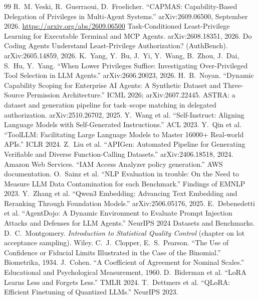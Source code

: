 \documentclass[11pt]{article}
\begin{document}
\begin{thebibliography}{99}
 R.~M. Veski, R.~Guerraoui, D.~Froelicher. ``CAPMAS: Capability-Based Delegation of
  Privileges in Multi-Agent Systems.'' arXiv:2609.06500, September 2026.
  \url{https://arxiv.org/abs/2609.06500}
 Task-Conditioned Least-Privilege Learning for Executable Terminal and MCP Agents. arXiv:2608.18351, 2026.
 Do Coding Agents Understand Least-Privilege Authorization? (AuthBench). arXiv:2605.14859, 2026.
 K.~Yang, Y.~Bu, J.~Yi, Y.~Wang, B.~Zhou, J.~Dai, S.~Hu, Y.~Yang. ``When Lower Privileges Suffice:
  Investigating Over-Privileged Tool Selection in LLM Agents.'' arXiv:2606.20023, 2026.
 H.~B.~Noyan. ``Dynamic Capability Scoping for Enterprise AI Agents: A Synthetic Dataset and
  Three-Source Permission Architecture.'' ICML 2026; arXiv:2607.22445.
 ASTRA: a dataset and generation pipeline for task--scope matching in delegated authorization. arXiv:2510.26702, 2025.
 Y.~Wang et al. ``Self-Instruct: Aligning Language Models with Self-Generated Instructions.'' ACL 2023.
 Y.~Qin et al. ``ToolLLM: Facilitating Large Language Models to Master 16000+ Real-world APIs.'' ICLR 2024.
 Z.~Liu et al. ``APIGen: Automated Pipeline for Generating Verifiable and Diverse Function-Calling Datasets.'' arXiv:2406.18518, 2024.
 Amazon Web Services. ``IAM Access Analyzer policy generation.'' AWS documentation.
 O.~Sainz et al. ``NLP Evaluation in trouble: On the Need to Measure LLM Data Contamination for each Benchmark.'' Findings of EMNLP 2023.
 Y.~Zhang et al. ``Qwen3 Embedding: Advancing Text Embedding and Reranking Through Foundation Models.'' arXiv:2506.05176, 2025.
 E.~Debenedetti et al. ``AgentDojo: A Dynamic Environment to Evaluate Prompt Injection Attacks and Defenses for LLM Agents.'' NeurIPS 2024 Datasets and Benchmarks.
 D.~C.~Montgomery. \emph{Introduction to Statistical Quality Control} (chapter on lot acceptance sampling). Wiley.
 C.~J.~Clopper, E.~S.~Pearson. ``The Use of Confidence or Fiducial Limits Illustrated in the Case of the Binomial.'' Biometrika, 1934.
 J.~Cohen. ``A Coefficient of Agreement for Nominal Scales.'' Educational and Psychological Measurement, 1960.
 D.~Biderman et al. ``LoRA Learns Less and Forgets Less.'' TMLR 2024.
 T.~Dettmers et al. ``QLoRA: Efficient Finetuning of Quantized LLMs.'' NeurIPS 2023.
\end{thebibliography}
\end{document}
